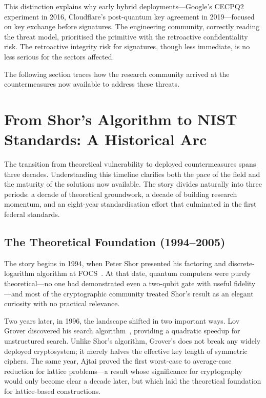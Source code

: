This distinction explains why early hybrid deployments---Google's CECPQ2 experiment in 2016, Cloudflare's post-quantum key agreement in 2019---focused on key exchange before signatures.  The engineering community, correctly reading the threat model, prioritised the primitive with the retroactive confidentiality risk.  The retroactive integrity risk for signatures, though less immediate, is no less serious for the sectors affected.

The following section traces how the research community arrived at the countermeasures now available to address these threats.


\section{From Shor's Algorithm to NIST Standards: A Historical Arc}
\label{sec:historical-arc}

The transition from theoretical vulnerability to deployed countermeasures spans three decades.  Understanding this timeline clarifies both the pace of the field and the maturity of the solutions now available.  The story divides naturally into three periods: a decade of theoretical groundwork, a decade of building research momentum, and an eight-year standardisation effort that culminated in the first federal standards.

\subsection{The Theoretical Foundation (1994--2005)}

The story begins in 1994, when Peter Shor presented his factoring and discrete-logarithm algorithm at FOCS~\cite{Shor1994}.  At that date, quantum computers were purely theoretical---no one had demonstrated even a two-qubit gate with useful fidelity---and most of the cryptographic community treated Shor's result as an elegant curiosity with no practical relevance.

Two years later, in 1996, the landscape shifted in two important ways.  Lov Grover discovered his search algorithm~\cite{Grover1996}, providing a quadratic speedup for unstructured search.  Unlike Shor's algorithm, Grover's does not break any widely deployed cryptosystem; it merely halves the effective key length of symmetric ciphers.  The same year, Ajtai proved the first worst-case to average-case reduction for lattice problems---a result whose significance for cryptography would only become clear a decade later, but which laid the theoretical foundation for lattice-based constructions.

